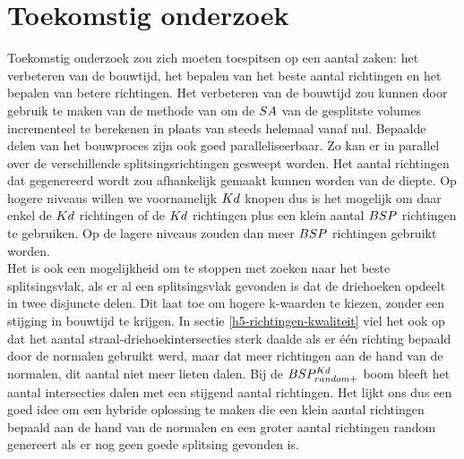 \section{Toekomstig onderzoek}
Toekomstig onderzoek zou zich moeten toespitsen op een aantal zaken: het verbeteren van de bouwtijd, het bepalen van het beste aantal richtingen en het bepalen van betere richtingen.
Het verbeteren van de bouwtijd zou kunnen door gebruik te maken van de methode van \authorBudge{} \cite{Budge} om de $SA$ van de gesplitste volumes incrementeel te berekenen in plaats van steeds helemaal vanaf nul.
Bepaalde delen van het bouwproces zijn ook goed paralleliseerbaar. 
Zo kan er in parallel over de verschillende splitsingsrichtingen gesweept worden.
Het aantal richtingen dat gegenereerd wordt zou afhankelijk gemaakt kunnen worden van de diepte.
Op hogere niveaus willen we voornamelijk $Kd$ knopen dus is het mogelijk om daar enkel de $Kd$ richtingen of de $Kd$ richtingen plus een klein aantal $BSP$ richtingen te gebruiken. Op de lagere niveaus zouden dan meer $BSP$ richtingen gebruikt worden.\\

Het is ook een mogelijkheid om te stoppen met zoeken naar het beste splitsingsvlak, als er al een splitsingsvlak gevonden is dat de driehoeken opdeelt in twee disjuncte delen.
Dit laat toe om hogere k-waarden te kiezen, zonder een stijging in bouwtijd te krijgen.
In sectie \ref{h5-richtingen-kwaliteit} viel het ook op dat het aantal straal-driehoekintersecties sterk daalde als er één richting bepaald door de normalen gebruikt werd, maar dat meer richtingen aan de hand van de normalen, dit aantal niet meer lieten dalen.
Bij de $BSP^{Kd}_{random+}$ boom bleeft het aantal intersecties dalen met een stijgend aantal richtingen.
Het lijkt ons dus een goed idee om een hybride oplossing te maken die een klein aantal richtingen bepaald aan de hand van de normalen en een groter aantal richtingen random genereert als er nog geen goede splitsing gevonden is.
